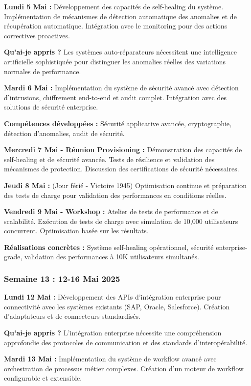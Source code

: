 \documentclass[a4paper,12pt]{article}
\begin{document}
\textbf{Lundi 5 Mai :}
Développement des capacités de self-healing du système. Implémentation de mécanismes de détection automatique des anomalies et de récupération automatique. Intégration avec le monitoring pour des actions correctives proactives.

\textbf{Qu'ai-je appris ?} Les systèmes auto-réparateurs nécessitent une intelligence artificielle sophistiquée pour distinguer les anomalies réelles des variations normales de performance.

\textbf{Mardi 6 Mai :}
Implémentation du système de sécurité avancé avec détection d'intrusions, chiffrement end-to-end et audit complet. Intégration avec des solutions de sécurité enterprise.

\textbf{Compétences développées :} Sécurité applicative avancée, cryptographie, détection d'anomalies, audit de sécurité.

\textbf{Mercredi 7 Mai - Réunion Provisioning :}
Démonstration des capacités de self-healing et de sécurité avancée. Tests de résilience et validation des mécanismes de protection. Discussion des certifications de sécurité nécessaires.

\textbf{Jeudi 8 Mai :} (Jour férié - Victoire 1945)
Optimisation continue et préparation des tests de charge pour validation des performances en conditions réelles.

\textbf{Vendredi 9 Mai - Workshop :}
Atelier de tests de performance et de scalabilité. Exécution de tests de charge avec simulation de 10,000 utilisateurs concurrent. Optimisation basée sur les résultats.

\textbf{Réalisations concrètes :} Système self-healing opérationnel, sécurité enterprise-grade, validation des performances à 10K utilisateurs simultanés.

\subsubsection{Semaine 13 : 12-16 Mai 2025}

\textbf{Lundi 12 Mai :}
Développement des APIs d'intégration enterprise pour connectivité avec les systèmes existants (SAP, Oracle, Salesforce). Création d'adaptateurs et de connecteurs standardisés.

\textbf{Qu'ai-je appris ?} L'intégration enterprise nécessite une compréhension approfondie des protocoles de communication et des standards d'interopérabilité.

\textbf{Mardi 13 Mai :}
Implémentation du système de workflow avancé avec orchestration de processus métier complexes. Création d'un moteur de workflow configurable et extensible.
\end{document}
